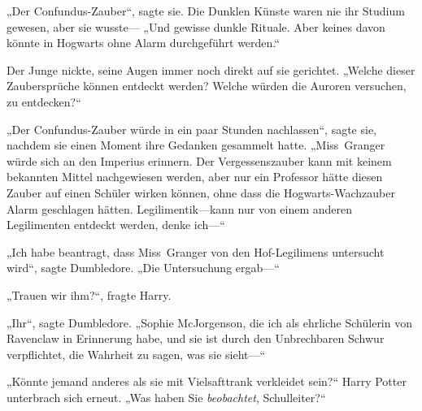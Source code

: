 „Der Confundus-Zauber“, sagte sie. Die Dunklen Künste waren nie ihr Studium gewesen, aber sie wusste—
„Und gewisse dunkle Rituale. Aber keines davon könnte in Hogwarts ohne Alarm durchgeführt werden.“

Der Junge nickte, seine Augen immer noch direkt auf sie gerichtet.
„Welche dieser Zaubersprüche können entdeckt werden? Welche würden die Auroren versuchen, zu entdecken?“

„Der Confundus-Zauber würde in ein paar Stunden nachlassen“, sagte sie, nachdem sie einen Moment ihre Gedanken gesammelt hatte.
„Miss~Granger würde sich an den Imperius erinnern. Der Vergessenszauber kann mit keinem bekannten Mittel nachgewiesen werden, aber nur ein Professor hätte diesen Zauber auf einen Schüler wirken können, ohne dass die Hogwarts-Wachzauber Alarm geschlagen hätten. Legilimentik—kann nur von einem anderen Legilimenten entdeckt werden, denke ich—“

„Ich habe beantragt, dass Miss~Granger von den Hof-Legilimens untersucht wird“, sagte Dumbledore.
„Die Untersuchung ergab—“

„Trauen wir ihm?“, fragte Harry.

„Ihr“, sagte Dumbledore.
„Sophie McJorgenson, die ich als ehrliche Schülerin von Ravenclaw in Erinnerung habe, und sie ist durch den Unbrechbaren Schwur verpflichtet, die Wahrheit zu sagen, was sie sieht—“

„Könnte jemand anderes als sie mit Vielsafttrank verkleidet sein?“ Harry Potter unterbrach sich erneut.
„Was haben Sie \emph{beobachtet}, Schulleiter?“

